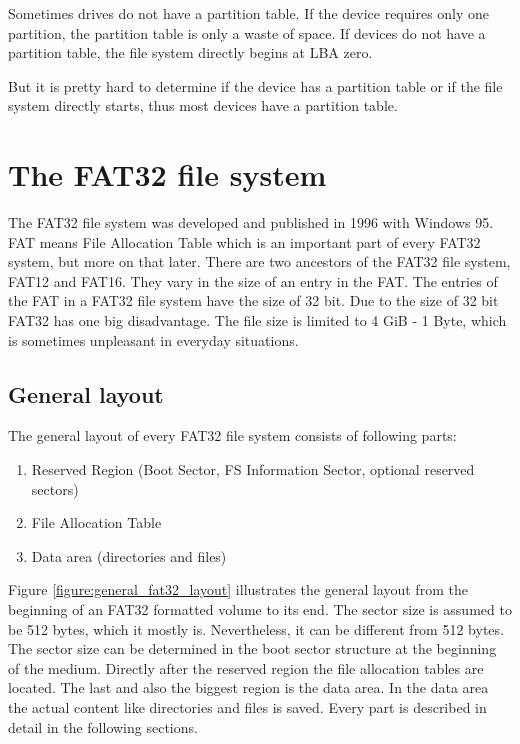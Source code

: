 Sometimes drives do not have a partition table. If the device requires only one partition, the partition table is only a waste of space. If devices do not have a partition table, the file system directly begins at LBA zero.

But it is pretty hard to determine if the device has a partition table or if the file system directly starts, thus most devices have a partition table. 

\section{The FAT32 file system}

The FAT32 file system was developed and published in 1996 with Windows 95. FAT means File Allocation Table which is an important part of every FAT32 system, but more on that later. There are two ancestors of the FAT32 file system, FAT12 and FAT16. They vary in the size of an entry in the FAT. The entries of the FAT in a FAT32 file system have the size of 32 bit. Due to the size of 32 bit FAT32 has one big disadvantage. The file size is limited to 4 GiB - 1 Byte, which is sometimes unpleasant in everyday situations\cite{wiki_fat}.

\subsection{General layout}

The general layout of every FAT32 file system consists of following parts\cite{fatgen103, wiki_fat}:

\begin{enumerate}
\item Reserved Region (Boot Sector, FS Information Sector, optional reserved sectors)
\item File Allocation Table
\item Data area (directories and files)
\end{enumerate}

Figure \ref{figure:general_fat32_layout} illustrates the general layout from the beginning of an FAT32 formatted volume to its end. The sector size is assumed to be 512 bytes, which it mostly is. Nevertheless, it can be different from 512 bytes. The sector size can be determined in the boot sector structure at the beginning of the medium. Directly after the reserved region the file allocation tables are located. The last and also the biggest region is the data area. In the data area the actual content like directories and files is saved. Every part is described in detail in the following sections.

